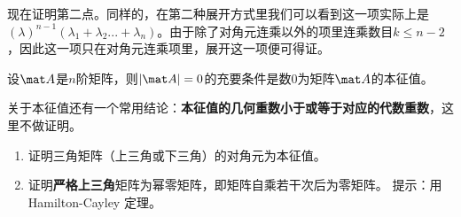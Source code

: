 现在证明第二点。同样的，在第二种展开方式里我们可以看到这一项实际上是$(\lambda)^{n-1}(\lambda_1+\lambda_2...+\lambda_n)$。由于除了对角元连乘以外的项里连乘数目$k\le n-2$，因此这一项只在对角元连乘项里，展开这一项便可得证。
\begin{corollary}{}
设$\mat A$是$n$阶矩阵，则$|\mat A|=0$的充要条件是数$0$为矩阵$\mat A$的本征值。
\end{corollary}
关于本征值还有一个常用结论：\textbf{本征值的几何重数小于或等于对应的代数重数}，这里不做证明。
\begin{exercise}{}
\begin{enumerate}
\item 证明三角矩阵（上三角或下三角）的对角元为本征值。
\item 证明\textbf{严格上三角}矩阵为幂零矩阵，即矩阵自乘若干次后为零矩阵。 提示：用Hamilton-Cayley 定理。
\end{enumerate}
\end{exercise}

